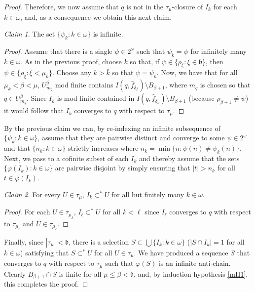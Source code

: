 \documentclass{amsart}
\theoremstyle{definition}
\theoremstyle{remark}
\newtheorem{claim}{Claim}
\begin{document}
\begin{proof}
  Therefore, we now assume that $q$ is not in the $\tau_\mu$-closure
  of $I_k$ for each $k\in \omega$, and, as a consequence we obtain
  this next claim.

  \begin{claim} The
  set $\{ \psi_k : k\in\omega\}$ is infinite.
  \end{claim}

  \begin{proof} Assume that there is a single $\psi\in 2^\omega$
  such that $\psi_k = \psi$ for infinitely many $k\in \omega$. 
  As in the previous proof, choose $\bar k$ so that, if 
   $\psi \in \{\rho_\xi : \xi\in\mathfrak b\}$, then
      $\psi \in \{ \rho_\xi : \xi < \mu_{\bar k}\}$. 
   Choose any $k >\bar k$ so that $\psi = \psi_k$. Now, 
   we have that for all $\mu_{ k} < \beta < \mu$,
   $U^\beta_{m_q} $ mod finite contains
    $ I(q,\hat f_{\delta_\beta}) \setminus B_{\beta+1}$, 
    where $m_q$ is chosen so that $q\in U^\beta_{m_q}$. 
    Since $I_k$ is mod finite contained in 
       $I(q,\hat f_{\delta_\beta})\setminus B_{\beta+1}$
       (because $\rho_{\beta+1}\neq \psi$) 
       it would follow that $I_k$ converges to $q$ with 
        respect to $\tau_\mu$.
  \end{proof}

By the previous claim we can, by re-indexing an infinite subsequence
 of $\{ \psi_k : k\in \omega\}$, assume that they are pairwise
 distinct and converge to some $\psi\in 2^\omega$ and that
    $\{ n_k : k\in\omega\}$ strictly increases where
     $n_k = \min\{ n : \psi(n)\neq \psi_k(n)\}$. 
  Next, we pass
 to a cofinite subset of each $I_k$ and thereby assume that
 the sets  $\{ \varphi(I_k) : k\in \omega\}$ are pairwise disjoint
 by simply ensuring that $|t|>n_k$ for all $ t\in \varphi(I_k)$.


 \begin{claim} For every $U\in \tau_\mu$, $I_k\subset^* U$ for all
 but finitely many $k\in \omega$.
 \end{claim}

 \begin{proof}  For each $U\in \tau_{\mu_k}$, $I_\ell\subset ^* U$
 for all $k<\ell$ since $I_\ell$ converges to $q$ with respect
 to $\tau_{\mu_\ell}$ and $U\in \tau_{\mu_\ell}$. 
 \end{proof}


  \egroup

  Finally, since $|\tau_\mu|<\mathfrak b$, there is a selection 
   $S\subset \bigcup\{ I_k : k\in \omega\}$  ($|S\cap I_k| = 1$
   for all $k\in \omega$)  satisfying that 
    $S\subset^* U$ for all $U\in \tau_\mu$.
We have produced a sequence $S$ that converges to $q$ with respect
to $\tau_\mu$ such that $\varphi(S)$ is an infinite anti-chain.
Clearly $B_{\beta+1}\cap S$ is finite for all $\mu\leq\beta<\mathfrak b$,
 and, by induction hypothesis \ref{mH1}, this completes the proof.
\end{proof}
\end{document}
